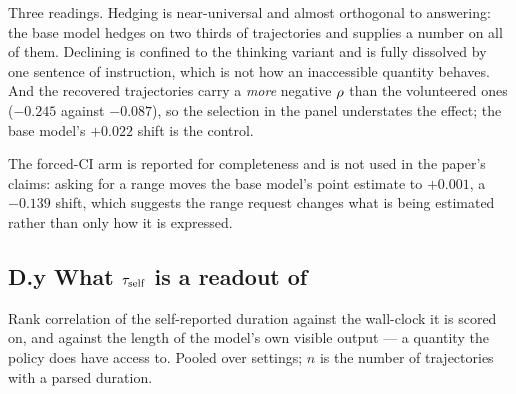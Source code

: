 Three readings. Hedging is near-universal and almost orthogonal to answering:
the base model hedges on two thirds of trajectories and supplies a number on
all of them. Declining is confined to the thinking variant and is fully
dissolved by one sentence of instruction, which is not how an inaccessible
quantity behaves. And the recovered trajectories carry a \emph{more} negative
$\rho$ than the volunteered ones ($-0.245$ against $-0.087$), so the
selection in the panel understates the effect; the base model's $+0.022$ shift
is the control.

The forced-CI arm is reported for completeness and is not used in the paper's
claims: asking for a range moves the base model's point estimate to $+0.001$,
a $-0.139$ shift, which suggests the range request changes what is being
estimated rather than only how it is expressed.

\subsection*{D.y What $\tau_{\mathrm{self}}$ is a readout of}

Rank correlation of the self-reported duration against the wall-clock it is
scored on, and against the length of the model's own visible output --- a
quantity the policy does have access to. Pooled over settings; $n$ is the
number of trajectories with a parsed duration.

